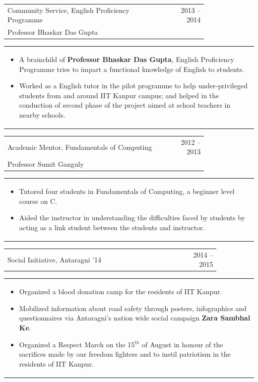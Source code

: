 \documentclass[a4paper,10pt]{article} %
\newcommand{\lproject}[4]{
    \begin{tabular}{p{0.80\linewidth}r}
        \textcolor{NavyBlue}{#2} & \multicolumn{1}{m{4cm}}{\raggedleft \textsc{#1}}\\
        #3
    \end{tabular}
    \begin{tabular}{p{\linewidth}}
    \vspace{-0.3cm}
        \footnotesize{#4}
    \end{tabular}
    \vspace{-0.5cm}
}
\newcommand{\iproject}[3]{
    \begin{tabular}{p{0.85\linewidth}r}
        \textcolor{NavyBlue}{#2} & \multicolumn{1}{m{3cm}}{\raggedleft \textsc{#1}}\\
    \end{tabular}
    \begin{tabular}{p{\linewidth}}
    \vspace{-0.3cm}
        \footnotesize{#3}
    \end{tabular}
    \vspace{-0.5cm}
}
\begin{document}
\lproject {2013 -- 2014}
          {Community Service, English Proficiency Programme}
          {Professor Bhaskar Das Gupta}
          {
               \begin{itemize}[leftmargin=0.5cm]
                   \item A brainchild of \textbf{Professor Bhaskar Das Gupta}, English Proficiency Programme
                       tries to impart a functional knowledge of English to students.
                   \item Worked as a English tutor in the pilot programme to help under-privileged students from
                       and around IIT Kanpur campus; and helped in the conduction of second phase of the project
                       aimed at school teachers in nearby schools.
               \end{itemize}
          }

\lproject {2012 -- 2013}
          {Academic Mentor, Fundamentals of Computing}
          {Professor Sumit Ganguly}
          {
               \begin{itemize}[leftmargin=0.5cm]
                   \item Tutored four students in Fundamentals of Computing, a beginner level course on C.
                   \item Aided the instructor in understanding the difficulties faced by students by acting as a link
                       student between the students and instructor.
               \end{itemize}
          }

\iproject {2014 -- 2015}
          {Social Initiative, Antaragni '14}
          {
               \begin{itemize}[leftmargin=0.5cm]
                   \item Organized a blood donation camp for the residents of IIT Kanpur.
                   \item Mobilized information about road safety through posters, infographics and questionnaires
                       via Antaragni's nation wide social campaign \textbf{Zara Sambhal Ke}.
                   \item Organized a Respect March on the 15$^{th}$ of August in honour of the sacrifices made by our
                       freedom fighters and to instil patriotism in the residents of IIT Kanpur.
               \end{itemize}
          }
\end{document}

